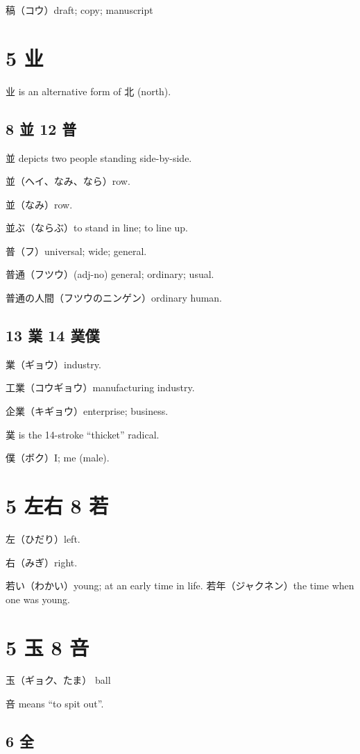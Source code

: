 稿（コウ）draft; copy; manuscript

\section{5 业}

业 is an alternative form of 北 (north).

\subsection{8 並 12 普}

並 depicts two people standing side-by-side.

並（ヘイ、なみ、なら）row.

並（なみ）row.

並ぶ（ならぶ）to stand in line; to line up.

普（フ）universal; wide; general.

普通（フツウ）(adj-no) general; ordinary; usual.

普通の人間（フツウのニンゲン）ordinary human.

\subsection{13 業 14 菐僕}

業（ギョウ）industry.

工業（コウギョウ）manufacturing industry.

企業（キギョウ）enterprise; business.

菐 is the 14-stroke ``thicket'' radical.

僕（ボク）I; me (male).

\section{5 左右 8 若}

左（ひだり）left.

右（みぎ）right.

若い（わかい）young; at an early time in life.
若年（ジャクネン）the time when one was young.

\section{5 玉 8 咅}

玉（ギョク、たま） ball

咅 means ``to spit out''.

\subsection{6 全}

